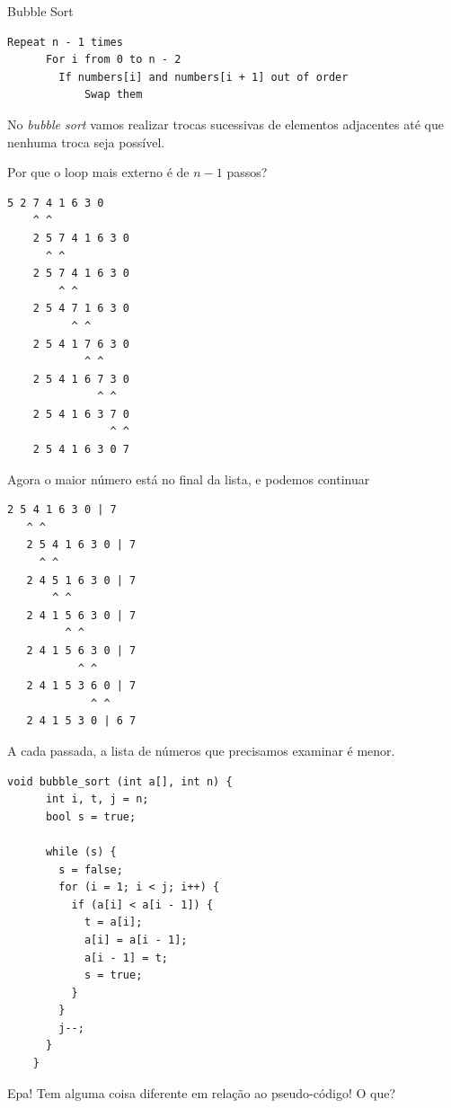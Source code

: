 \documentclass{beamer}
\begin{document}
\begin{frame}{Bubble Sort}

  \begin{lstlisting}[style=code]
    Repeat n - 1 times
      For i from 0 to n - 2
        If numbers[i] and numbers[i + 1] out of order
            Swap them
  \end{lstlisting}

  No \emph{bubble sort} vamos realizar trocas sucessivas de elementos
  adjacentes até que nenhuma troca seja possível.

  Por que o loop mais externo é de $n - 1$ passos?

  \framebreak

  \begin{lstlisting}[style=code]
    5 2 7 4 1 6 3 0
    ^ ^
    2 5 7 4 1 6 3 0
      ^ ^
    2 5 7 4 1 6 3 0
        ^ ^
    2 5 4 7 1 6 3 0
          ^ ^
    2 5 4 1 7 6 3 0
            ^ ^
    2 5 4 1 6 7 3 0
              ^ ^
    2 5 4 1 6 3 7 0
                ^ ^
    2 5 4 1 6 3 0 7
  \end{lstlisting}

  \framebreak

  Agora o maior número está no final da lista, e podemos continuar 

  \begin{lstlisting}[style=code]
   2 5 4 1 6 3 0 | 7
   ^ ^
   2 5 4 1 6 3 0 | 7
     ^ ^
   2 4 5 1 6 3 0 | 7
       ^ ^
   2 4 1 5 6 3 0 | 7
         ^ ^
   2 4 1 5 6 3 0 | 7
           ^ ^
   2 4 1 5 3 6 0 | 7
             ^ ^
   2 4 1 5 3 0 | 6 7
  \end{lstlisting}
  
  A cada passada, a lista de números que precisamos examinar é menor.

  \framebreak

  \begin{lstlisting}[style=normalc,caption=src/bubble.c]
    void bubble_sort (int a[], int n) {
      int i, t, j = n;
      bool s = true;
      
      while (s) {
        s = false;
        for (i = 1; i < j; i++) {
          if (a[i] < a[i - 1]) {
            t = a[i];
            a[i] = a[i - 1];
            a[i - 1] = t;
            s = true;
          }
        }
        j--;
      }
    }
  \end{lstlisting}

  \framebreak

  Epa! Tem alguma coisa diferente em relação ao pseudo-código! O que?


\end{frame}
\end{document}
